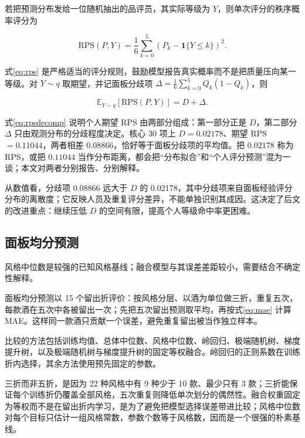 若把预测分布发给一位随机抽出的品评员，其实际等级为 $Y$，则单次评分的秩序概率评分为

\begin{equation}
\mathrm{RPS}(P,Y)=\frac{1}{6}\sum_{k=0}^{5}\left(P_k-\mathbf{1}\{Y\le k\}\right)^2.
\label{eq:rps}
\end{equation}

式\eqref{eq:rps} 是严格适当的评分规则，鼓励模型报告真实概率而不是把质量压向某一等级\cite{gneiting2007}。对 $Y\sim q$ 取期望，并记面板分歧项 $\Delta=\frac{1}{6}\sum_{k=0}^{5}Q_k(1-Q_k)$，则

\begin{equation}
\mathbb{E}_{Y\sim q}\left[\mathrm{RPS}(P,Y)\right]=D+\Delta.
\label{eq:rpsdecomp}
\end{equation}

式\eqref{eq:rpsdecomp} 说明个人期望 RPS 由两部分组成：第一部分正是 $D$，第二部分 $\Delta$ 只由观测分布的分歧程度决定。核心 30 项上 $D=0.02178$、期望 RPS $=0.11044$，两者相差 $0.08866$，恰好等于面板分歧项的平均值。把 $0.02178$ 称为 RPS，或把 $0.11044$ 当作分布距离，都会把“分布拟合”和“个人评分预测”混为一谈；本文对两者分别报告、分别解释。

从数值看，分歧项 0.08866 远大于 $D$ 的 0.02178，其中分歧项来自面板经验评分分布的离散度；它反映人员及重复评分差异，不能单独识别其成因。这决定了后文的改进重点：继续压低 $D$ 的空间有限，提高个人等级命中率更困难。

\subsection{面板均分预测}

风格中位数是较强的已知风格基线；融合模型与其误差差距较小，需要结合不确定性解释。

面板均分预测以 15 个留出折评价：按风格分层、以酒为单位做三折，重复五次，每款酒在五次中各被留出一次；先把五次留出预测取平均，再按式\eqref{eq:mae} 计算 MAE。这样同一款酒只贡献一个误差，避免重复留出被当作独立样本。

比较的方法包括训练均值、总体中位数、风格中位数、岭回归、极端随机树、梯度提升树，以及极端随机树与梯度提升树的固定等权融合\cite{geurts2006,friedman2001,breiman1996,wolpert1992}。岭回归的正则系数在训练折内选择，其余方法使用预先固定的参数。

三折而非五折，是因为 22 种风格中有 9 种少于 10 款、最少只有 3 款；三折能保证每个训练折仍覆盖全部风格，五次重复则降低单次划分的偶然性。融合权重固定为等权而不是在留出折内学习，是为了避免把模型选择误差带进比较；风格中位数对每个目标只估计一组风格常数，参数个数等于风格数，因而是一个很强的朴素基线。

